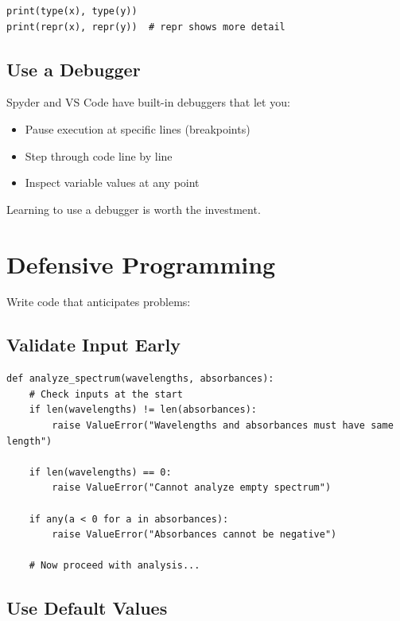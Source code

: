 \begin{lstlisting}
print(type(x), type(y))
print(repr(x), repr(y))  # repr shows more detail
\end{lstlisting}

\subsection{Use a Debugger}

Spyder and VS Code have built-in debuggers that let you:
\begin{itemize}
    \item Pause execution at specific lines (breakpoints)
    \item Step through code line by line
    \item Inspect variable values at any point
\end{itemize}

Learning to use a debugger is worth the investment.

\section{Defensive Programming}
\label{sec:defensive}

Write code that anticipates problems:

\subsection{Validate Input Early}

\begin{lstlisting}
def analyze_spectrum(wavelengths, absorbances):
    # Check inputs at the start
    if len(wavelengths) != len(absorbances):
        raise ValueError("Wavelengths and absorbances must have same length")

    if len(wavelengths) == 0:
        raise ValueError("Cannot analyze empty spectrum")

    if any(a < 0 for a in absorbances):
        raise ValueError("Absorbances cannot be negative")

    # Now proceed with analysis...
\end{lstlisting}

\subsection{Use Default Values}

